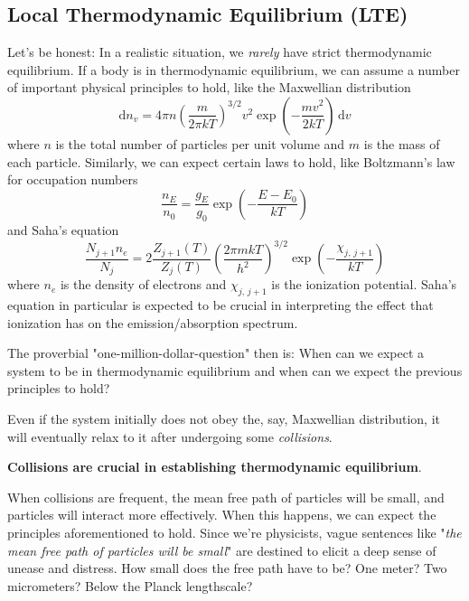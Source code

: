 \subsection*{Local Thermodynamic Equilibrium (LTE)}
Let's be honest: In a realistic situation, we \emph{rarely} have strict thermodynamic equilibrium. If a body is in thermodynamic equilibrium, we can assume a number of important physical principles to hold, like the Maxwellian distribution 
\begin{equation}
	\text{d}n_{v} = 4\pi n \left(\frac{m}{2\pi k T}\right)^{3/2}v^{2}\exp\left(-\frac{mv^{2}}{2kT}\right)\,\text{d}v
	\label{eq:maxwell}
\end{equation}
where $n$ is the total number of particles per unit volume and $m$ is the mass of each particle. Similarly, we can expect certain laws to hold, like Boltzmann's law for occupation numbers
\begin{equation}
	\frac{n_{E}}{n_{0}} = \frac{g_{E}}{g_{0}}\exp\left(-\frac{E-E_{0}}{kT}\right)
	\label{eq:boltmann-occ}
\end{equation}
and Saha's equation
\begin{equation}
	\frac{N_{j+1}n_{e}}{N_{j}} = 2\frac{Z_{j+1}(T)}{Z_{j}(T)}\left(\frac{2\pi m k T}{h^{2}}\right)^{3/2}\exp\left(-\frac{\chi_{j,\,j+1}}{kT}\right)
	\label{eq:saha}
\end{equation}
where $n_{e}$ is the density of electrons and $\chi_{j,\,j+1}$ is the ionization potential. Saha's equation in particular is expected to be crucial in interpreting the effect that ionization has on the emission/absorption spectrum.
\par The proverbial "one-million-dollar-question" then is: When can we expect a system to be in thermodynamic equilibrium and when can we expect the previous principles to hold?
\par Even if the system initially does not obey the, say, Maxwellian distribution, it will eventually relax to it after undergoing some \emph{collisions}.
\par \textbf{Collisions are crucial in establishing thermodynamic equilibrium}. 
\par When collisions are frequent, the mean free path of particles will be small, and particles will interact more effectively. When this happens, we can expect the principles aforementioned to hold. Since we're physicists, vague sentences like "\emph{the mean free path of particles will be small}" are destined to elicit a deep sense of unease and distress. How small does the free path have to be? One meter? Two micrometers? Below the Planck lengthscale?
